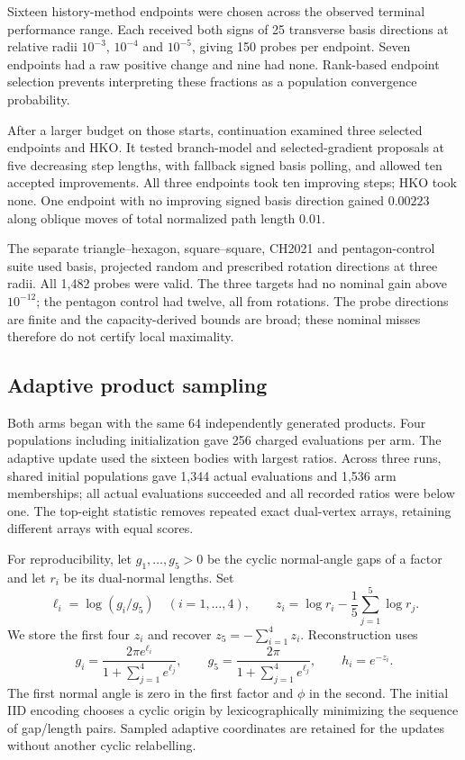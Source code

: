 Sixteen history-method endpoints were chosen across the observed terminal
performance range. Each received both signs of 25 transverse basis
directions at relative radii $10^{-3}$, $10^{-4}$ and $10^{-5}$, giving
150 probes per endpoint. Seven endpoints had a raw positive change and
nine had none. Rank-based endpoint selection prevents interpreting these
fractions as a population convergence probability.

After a larger budget on those starts, continuation examined three
selected endpoints and HKO. It tested branch-model and selected-gradient
proposals at five decreasing step lengths, with fallback signed basis
polling, and allowed ten accepted improvements. All three endpoints took
ten improving steps; HKO took none. One endpoint with no improving signed
basis direction gained $0.00223$ along oblique moves of total normalized
path length $0.01$.

The separate triangle--hexagon, square--square, CH2021 and pentagon-control
suite used basis, projected random and prescribed rotation directions at
three radii. All 1,482 probes were valid. The three targets had no nominal
gain above $10^{-12}$; the pentagon control had twelve, all from rotations.
The probe directions are finite and the capacity-derived bounds are broad;
these nominal misses therefore do not certify local maximality.

\FloatBarrier
\subsection{Adaptive product sampling}\label{app:ds-adaptive}

Both arms began with the same 64 independently generated products. Four
populations including initialization gave 256 charged evaluations per arm.
The adaptive update used the sixteen bodies with largest ratios. Across
three runs, shared initial populations gave 1,344 actual evaluations and
1,536 arm memberships; all actual evaluations succeeded and all recorded
ratios were below one. The top-eight statistic removes repeated exact
dual-vertex arrays, retaining different arrays with equal scores.

For reproducibility, let $g_1,\ldots,g_5>0$ be the cyclic normal-angle gaps
of a factor and let $r_i$ be its dual-normal lengths. Set
\[
 \ell_i=\log(g_i/g_5)\quad(i=1,\ldots,4),\qquad
 z_i=\log r_i-\frac15\sum_{j=1}^5\log r_j.
\]
We store the first four $z_i$ and recover $z_5=-\sum_{i=1}^4z_i$.
Reconstruction uses
\[
 g_i=\frac{2\pi e^{\ell_i}}{1+\sum_{j=1}^4e^{\ell_j}},\qquad
 g_5=\frac{2\pi}{1+\sum_{j=1}^4e^{\ell_j}},\qquad h_i=e^{-z_i}.
\]
The first normal angle is zero in the first factor and $\phi$ in the second.
The initial IID encoding chooses a cyclic origin by lexicographically
minimizing the sequence of gap/length pairs. Sampled adaptive coordinates
are retained for the updates without another cyclic relabelling.

